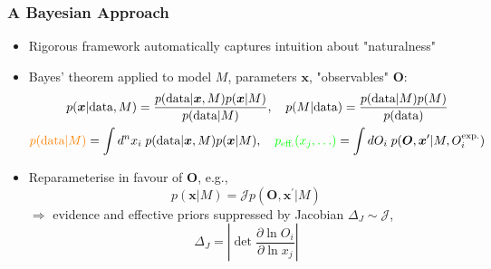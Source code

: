 \documentclass[10pt,aspectratio=169]{beamer}
\begin{document}
\begin{frame}
  \frametitle{A Bayesian Approach}
  \begin{itemize}\itemsep1em
    \item Rigorous framework {\color{blue} automatically captures intuition
      about "naturalness"}
    \item Bayes' theorem applied to model $M$, parameters $\bm{x}$,
      "observables" $\bm{O}$:
      \begin{gather*}
        p(\bm{x}|\text{data},M) = \frac{p(\text{data}|\bm{x},M) p(\bm{x}|M)}
        {p(\text{data}|M)} , \quad
        p(M|\text{data}) = \frac{p(\text{data}|M) p(M)}{p(\text{data})} \\
        {\color{orange} p(\text{data}|M)}
      = \int d^n x_i\; p(\text{data}|
        \bm{x},M) p(\bm{x}|M), \quad
        {\color{green} p_{\text{eff.}}(x_j,\ldots)} = \int dO_i \;
          p(\bm{O}, \bm{x}^\prime | M, O_i^{\text{exp.}})
      \end{gather*}
    \item Reparameterise in favour of $\bm{O}$, e.g.,
      \begin{equation*}
        p(\bm{x}|M) = \mathcal{J} p(\bm{O},\bm{x}^\prime|M)
      \end{equation*}
      $\Rightarrow$ {\color{orange} evidence} and {\color{green}
      effective priors} {\color{blue} suppressed by Jacobian} $\Delta_J
      \sim \mathcal{J}$,
      \begin{equation*}
        \Delta_J = \left | \det \frac{\partial \ln O_i}{\partial \ln x_j}
        \right |
      \end{equation*}
 \end{itemize}
\end{frame}
\end{document}
